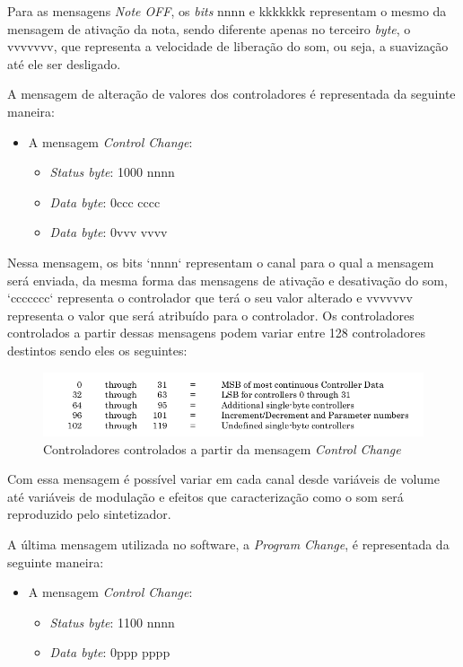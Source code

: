 \documentclass[12pt]{report}
\begin{document}
Para as mensagens {\it Note OFF}, os {\it bits} nnnn e kkkkkkk
representam o mesmo da mensagem de ativação da nota, sendo diferente
apenas no terceiro {\it byte}, o vvvvvvv, que representa a velocidade
de liberação do som, ou seja, a suavização até ele ser desligado.

A mensagem de alteração de valores dos controladores é representada da seguinte maneira:
\begin{itemize}
  \item A mensagem {\it Control Change}:
  \begin{itemize}
    \item {\it Status byte}: 1000 nnnn
    \item {\it Data byte}: 0ccc cccc
    \item {\it Data byte}: 0vvv vvvv
  \end{itemize}
\end{itemize}

Nessa mensagem, os bits `nnnn` representam o canal para o qual a
mensagem será enviada, da mesma forma das mensagens de ativação e
desativação do som, `ccccccc` representa o controlador que terá o seu
valor alterado e vvvvvvv representa o valor que será atribuído para o
controlador. Os controladores controlados a partir dessas mensagens
podem variar entre 128 controladores destintos sendo eles os
seguintes:

\begin{figure}[H]
  \centering
    \includegraphics[width=\textwidth]{imagens/controladores.png}
    \caption{Controladores controlados a partir da mensagem {\it Control Change}}
  \label{fig:controladores}
\end{figure}

Com essa mensagem é possível variar em cada canal desde variáveis de
volume até variáveis de modulação e efeitos que caracterização como o
som será reproduzido pelo sintetizador.

A última mensagem utilizada no software, a  {\it Program  Change}, é
representada da seguinte maneira:
\begin{itemize}
  \item A mensagem {\it Control Change}:
  \begin{itemize}
    \item {\it Status byte}: 1100 nnnn
    \item {\it Data byte}: 0ppp pppp
  \end{itemize}
\end{itemize}
\end{document}
